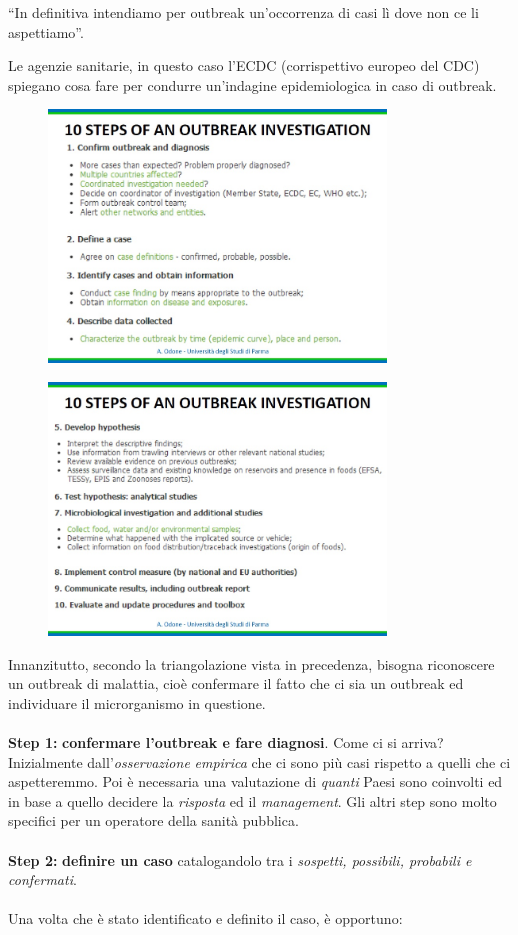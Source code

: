 ``In definitiva intendiamo per outbreak un'occorrenza di casi lì dove
non ce li aspettiamo''.

Le agenzie sanitarie, in questo caso l'ECDC (corrispettivo europeo del
CDC) spiegano cosa fare per condurre un'indagine epidemiologica in caso
di outbreak.

\begin{figure}[!ht]
\centering
	\includegraphics[width=0.8\textwidth]{26/image7.jpeg}
	\end{figure}
	
\begin{figure}[!ht]
\centering
	\includegraphics[width=0.8\textwidth]{26/image8.jpeg}
	\end{figure}

Innanzitutto, secondo la triangolazione vista in precedenza, bisogna
riconoscere un outbreak di malattia, cioè confermare il fatto che ci sia
un outbreak ed individuare il microrganismo in questione.
\\\\
\textbf{Step 1:} \textbf{confermare l'outbreak e fare diagnosi}. Come ci
si arriva? Inizialmente dall'\emph{osservazione} \emph{empirica} che ci
sono più casi rispetto a quelli che ci aspetteremmo. Poi è necessaria
una valutazione di \emph{quanti} Paesi sono coinvolti ed in base a
quello decidere la \emph{risposta} ed il \emph{management}. Gli altri
step sono molto specifici per un operatore della sanità pubblica.
\\\\
\textbf{Step 2:} \textbf{definire un caso} catalogandolo tra i
\emph{sospetti, possibili, probabili e confermati}.
\\\\
Una volta che è stato identificato e definito il caso, è opportuno:

